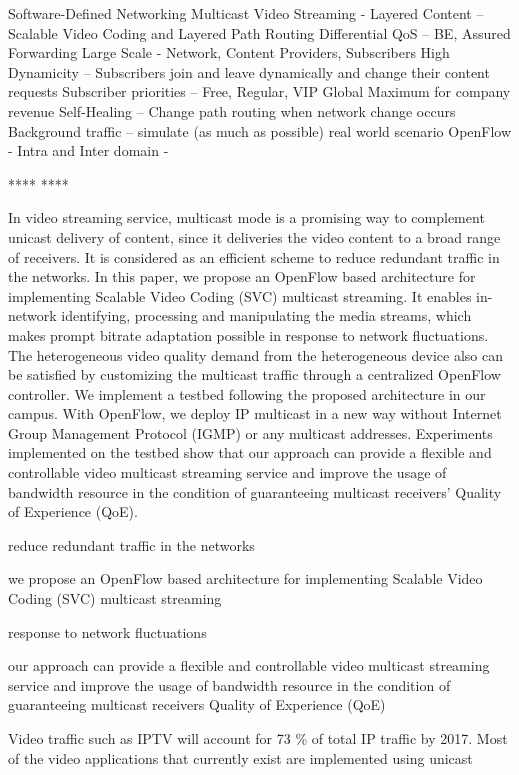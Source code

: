 \documentclass[a4paper, 10pt, conference]{ieeeconf}
\begin{document}
Software-Defined Networking
Multicast Video Streaming - 
Layered Content – Scalable Video Coding and Layered Path Routing
Differential QoS – BE, Assured Forwarding
Large Scale - Network, Content Providers, Subscribers
High Dynamicity – Subscribers join and leave dynamically and change their content requests
Subscriber priorities – Free, Regular, VIP
Global Maximum for company revenue
Self-Healing – Change path routing when network change occurs
Background traffic – simulate (as much as possible) real world scenario
OpenFlow - 
Intra and Inter domain - 

**** \cite{yang2014multicast} ****

In video streaming service, multicast mode is a
promising way to complement unicast delivery of content, since
it deliveries the video content to a broad range of receivers. It is
considered as an efficient scheme to reduce redundant traffic in
the networks. In this paper, we propose an OpenFlow based
architecture for implementing Scalable Video Coding (SVC)
multicast streaming. It enables in-network identifying, processing
and manipulating the media streams, which makes prompt
bitrate adaptation possible in response to network fluctuations.
The heterogeneous video quality demand from the heterogeneous
device also can be satisfied by customizing the multicast traffic
through a centralized OpenFlow controller. We implement a
testbed following the proposed architecture in our campus.
With OpenFlow, we deploy IP multicast in a new way without
Internet Group Management Protocol (IGMP) or any multicast
addresses. Experiments implemented on the testbed show that
our approach can provide a flexible and controllable video
multicast streaming service and improve the usage of bandwidth
resource in the condition of guaranteeing multicast receivers’
Quality of Experience (QoE).

reduce redundant traffic in the networks

we propose an OpenFlow based architecture for implementing Scalable Video Coding (SVC) multicast streaming

response to network fluctuations

our approach can provide a flexible and controllable video multicast streaming service and improve the usage of bandwidth resource in the condition of guaranteeing multicast receivers Quality of Experience (QoE)

Video traffic such as IPTV will account for 73 \% of total IP traffic by 2017. Most of the video applications that currently exist are implemented using unicast
\end{document}
